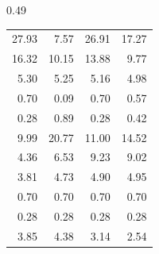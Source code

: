 \begin{table}
\begin{subtable}[b]{0.49\linewidth}
\begin{tabular}{rr|rr}
             \midrule
                                                                                                                                    27.93 &               7.57 &              26.91 &              17.27 \\
                                                                                                                                    16.32 &              10.15 &              13.88 &               9.77 \\
                                                                                                                                     5.30 &               5.25 &               5.16 &               4.98 \\
                                                                                                                                     0.70 &               0.09 &               0.70 &               0.57 \\
                                                                                                                                     0.28 &               0.89 &               0.28 &               0.42 \\
             \midrule
                                                                                                                                     9.99 &              20.77 &              11.00 &              14.52 \\
                                                                                                                                     4.36 &               6.53 &               9.23 &               9.02 \\
                                                                                                                                     3.81 &               4.73 &               4.90 &               4.95 \\
                                                                                                                                     0.70 &               0.70 &               0.70 &               0.70 \\
                                                                                                                                     0.28 &               0.28 &               0.28 &               0.28 \\
             \midrule
                                                                                                                                     3.85 &               4.38 &               3.14 &               2.54 \\

\end{tabular}
\end{subtable}
\end{table}
